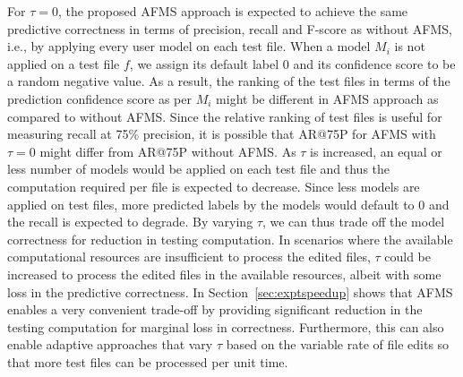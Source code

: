 {For $\tau=0$, the proposed AFMS approach is expected to achieve the same predictive correctness in terms of precision, recall and F-score as without AFMS, i.e., by applying every user model on each test file. When a model $M_i$ is not applied on a test file $f$, we assign its default label 0 and its confidence score to be a random negative value. 
As a result, the ranking of the test files in terms of the prediction confidence score as per $M_i$ might be different in AFMS approach as compared to without AFMS. Since the relative ranking of test files is useful for measuring recall at 75\% precision, it is possible that AR@75P for AFMS with $\tau=0$ might differ from AR@75P without AFMS. As $\tau$ is increased, an equal or less number of models would be applied on each test file and thus the computation required per file is expected to decrease. Since less models are applied on test files, more predicted labels by the models would default to 0 and the recall is expected to degrade. By varying $\tau$, we can thus trade off the model correctness for reduction in testing computation. 
In scenarios where the available computational resources are insufficient to process the edited files, $\tau$ could be increased to process the edited files in the available resources, albeit with some loss in the predictive correctness. 
In Section~\ref{sec:exptspeedup} shows that AFMS enables a very convenient trade-off by providing significant reduction in the testing computation for marginal loss in correctness. 
Furthermore, this can also enable adaptive approaches that vary $\tau$ based on the variable rate of file edits so that more test files can be processed per unit time. 

}
